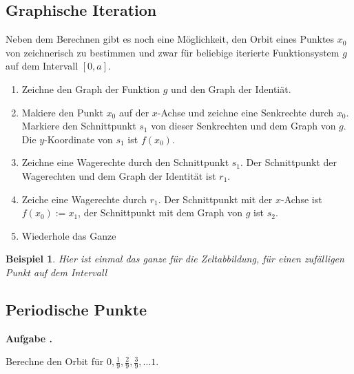 \documentclass[a4paper,ngerman,12pt]{scrartcl}
\theoremstyle{definition}
\theoremstyle{plain}
\newtheorem{beispiel}[defn]{Beispiel}
\theoremstyle{remark}
\newlength{\aufgabenskip}
\newcounter{aufgabennummer}
\newenvironment{aufgabe}[1]{
  \addtocounter{aufgabennummer}{1}
  \textbf{Aufgabe \theaufgabennummer.} \emph{#1} \par
}{\vspace{\aufgabenskip}}
\begin{document}
\subsection{Graphische Iteration}
Neben dem Berechnen gibt es noch eine Möglichkeit, den Orbit eines Punktes $x_0$ von zeichnerisch zu bestimmen und zwar für beliebige iterierte Funktionsystem $g$ auf dem Intervall $[0,a]$.
\begin{enumerate}
\item Zeichne den Graph der Funktion $g$ und den Graph der Identiät.
\begin{figure}

\end{figure}
\item Makiere den Punkt $x_0$ auf der $x$-Achse und zeichne eine Senkrechte durch $x_0$. Markiere den Schnittpunkt $s_1$ von dieser Senkrechten und dem Graph von $g$. Die $y$-Koordinate von $s_1$ ist $f\left(x_0\right)$.
\begin{figure}

\end{figure}
\item Zeichne eine Wagerechte durch den Schnittpunkt $s_1$. Der Schnittpunkt der Wagerechten und dem Graph der Identität ist $r_1$.
\begin{figure}

\end{figure} 
\item Zeiche eine Wagerechte durch $r_1$. Der Schnittpunkt mit der $x$-Achse ist $f\left(x_0\right):=x_1$, der Schnittpunkt mit dem Graph von $g$ ist $s_2$.
\begin{figure}

\end{figure}
\item Wiederhole das Ganze
\end{enumerate}

\begin{beispiel}
Hier ist einmal das ganze für die Zeltabbildung, für einen zufälligen Punkt auf dem Intervall
\begin{figure}

\end{figure}
\end{beispiel}


\subsection{Periodische Punkte}
\begin{aufgabe}\\
Berechne den Orbit für $0, \frac{1}{9}, \frac{2}{9}, \frac{3}{9}, \ldots 1$. 
\end{aufgabe}
\end{document}
